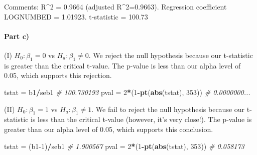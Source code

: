 \documentclass[
]{article}
\newenvironment{Shaded}{\begin{snugshade}}{\end{snugshade}}
\newcommand{\CommentTok}[1]{\textcolor[rgb]{0.56,0.35,0.01}{\textit{#1}}}
\newcommand{\DecValTok}[1]{\textcolor[rgb]{0.00,0.00,0.81}{#1}}
\newcommand{\FunctionTok}[1]{\textcolor[rgb]{0.13,0.29,0.53}{\textbf{#1}}}
\newcommand{\NormalTok}[1]{#1}
\newcommand{\OtherTok}[1]{\textcolor[rgb]{0.56,0.35,0.01}{#1}}
\newcommand{\SpecialCharTok}[1]{\textcolor[rgb]{0.81,0.36,0.00}{\textbf{#1}}}
\begin{document}
\n Comments: R\^{}2 = 0.9664 (adjusted R\^{}2=0.9663). Regression
coefficient LOGNUMBED = 1.01923. t-statistic = 100.73

\hypertarget{part-c}{%
\paragraph{Part c)}\label{part-c}}

\begin{Shaded}
\end{Shaded}

\n (I) \(H_0:\beta_{1}=0\) vs \(H_a:\beta_{1}\ne0\). We reject the null
hypothesis because our t-statistic is greater than the critical t-value.
The p-value is less than our alpha level of 0.05, which supports this
rejection.

\begin{Shaded}
\begin{Highlighting}[]
\NormalTok{tstat }\OtherTok{=}\NormalTok{ b1}\SpecialCharTok{/}\NormalTok{seb1 }\CommentTok{\# 100.730193}
\NormalTok{pval }\OtherTok{=} \DecValTok{2}\SpecialCharTok{*}\NormalTok{(}\DecValTok{1}\SpecialCharTok{{-}}\FunctionTok{pt}\NormalTok{(}\FunctionTok{abs}\NormalTok{(tstat), }\DecValTok{353}\NormalTok{)) }\CommentTok{\# 0.0000000...}
\end{Highlighting}
\end{Shaded}

\n (II) \(H_0:\beta_{1}=1\) vs \(H_a:\beta_{1}\ne1\). We fail to reject
the null hypothesis because our t-statistic is less than the critical
t-value (however, it's very close!). The p-value is greater than our
alpha level of 0.05, which supports this conclusion.

\begin{Shaded}
\begin{Highlighting}[]
\NormalTok{tstat }\OtherTok{=}\NormalTok{ (b1}\DecValTok{{-}1}\NormalTok{)}\SpecialCharTok{/}\NormalTok{seb1 }\CommentTok{\# 1.900567}
\NormalTok{pval }\OtherTok{=} \DecValTok{2}\SpecialCharTok{*}\NormalTok{(}\DecValTok{1}\SpecialCharTok{{-}}\FunctionTok{pt}\NormalTok{(}\FunctionTok{abs}\NormalTok{(tstat), }\DecValTok{353}\NormalTok{)) }\CommentTok{\# 0.058173}
\end{Highlighting}
\end{Shaded}
\end{document}
